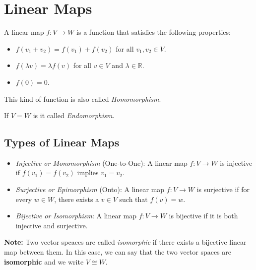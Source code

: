 \section{Linear Maps}
A linear map \( f: V \to W \) is a function that satisfies the following properties:

\begin{itemize}[label=\(-\)]
    \item \( f(v_1 + v_2) = f(v_1) + f(v_2) \) for all \( v_1, v_2 \in V \).
    \item \( f(\lambda v) = \lambda f(v) \) for all \( v \in V \) and \( \lambda \in \mathbb{R} \).
    \item \( f(0) = 0 \).
\end{itemize} 

 This kind of function is also called \emph{Homomorphism}.

 If \(V = W\) is it called \emph{Endomorphism}.

\subsection{Types of Linear Maps}

\begin{itemize}[label=\(-\)]
    \item \emph{Injective or Monomorphism} (One-to-One): A linear map \( f: V \to W \) is injective if \( f(v_1) = f(v_2) \) implies \( v_1 = v_2 \).
    \item \emph{Surjective or Epimorphism} (Onto): A linear map \( f: V \to W \) is surjective if for every \( w \in W \), there exists a \( v \in V \) such that \( f(v) = w \).
    \item \emph{Bijective or Isomorphism}: A linear map \( f: V \to W \) is bijective if it is both injective and surjective.
\end{itemize}

\textbf{Note:} Two vector spcaces are called 
\emph{isomorphic} if there exists a bijective linear map between them. In this case, we can say that the two vector spaces are \textbf{isomorphic} and we write \( V \cong W \).

